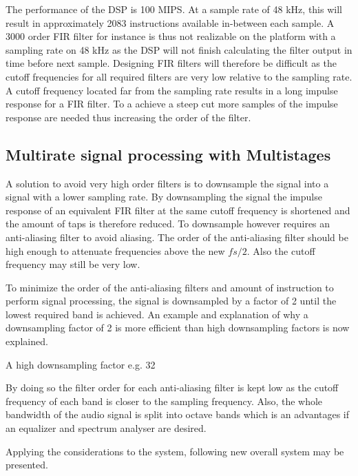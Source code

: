 The performance of the DSP is 100 MIPS. At a sample rate of 48 kHz, this will result in approximately 2083 instructions available in-between each sample. A 3000 order FIR filter for instance is thus not realizable on the platform with a sampling rate on 48 kHz as the DSP will not finish calculating the filter output in time before next sample. Designing FIR filters will therefore be difficult as the cutoff frequencies for all required filters are very low relative to the sampling rate. A cutoff frequency located far from the sampling rate results in a long impulse response for a FIR filter. To a achieve a steep cut more samples of the impulse response are needed thus increasing the order of the filter. 

\subsection*{Multirate signal processing with Multistages}
A solution to avoid very high order filters is to downsample the signal into a signal with a lower sampling rate. By downsampling the signal the impulse response of an equivalent FIR filter at the same cutoff frequency is shortened and the amount of taps is therefore reduced. To downsample however requires an anti-aliasing filter to avoid aliasing. The order of the anti-aliasing filter should be high enough to attenuate frequencies above the new $fs/2$. Also the cutoff frequency may still be very low. 

To minimize the order of the anti-aliasing filters and amount of instruction to perform signal processing, the signal is downsampled by a factor of 2 until the lowest required band is achieved. An example and explanation of why a downsampling factor of 2 is more efficient than high downsampling factors is now explained. 

A high downsampling factor e.g. 32




By doing so the filter order for each anti-aliasing filter is kept low as the cutoff frequency of each band is closer to the sampling frequency. Also, the whole bandwidth of the audio signal is split into octave bands which is an advantages if an equalizer and spectrum analyser are desired.

Applying the considerations to the system, following new overall system may be presented.

